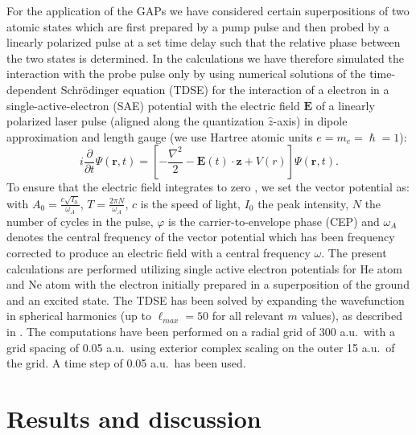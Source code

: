 For the application of the GAPs we have considered certain superpositions of two atomic states which are first prepared by a pump pulse and then probed by a linearly polarized pulse at a set time delay such that the relative phase between the two states is determined. In the calculations we have therefore simulated the interaction with the probe pulse only by
using numerical solutions of the time-dependent Schr\"odinger equation (TDSE) for the interaction of a electron in a single-active-electron (SAE) potential with the electric field $\mathbf{E}$ of a linearly polarized laser pulse (aligned along the quantization ${\hat z}$-axis) in dipole approximation and length gauge (we use Hartree atomic units $e = m_e = \hslash =1$): 
\begin{equation}
i\frac{\partial}{\partial t}\Psi(\mathbf{r},t) = \left[-\frac{\nabla^2}{2} - \mathbf{E}(t) \cdot \mathbf{z} + V(r)\right]\Psi(\mathbf{r},t).
\end{equation}
To ensure that the electric field integrates to zero \cite{chelkowski2002}, we set the vector potential as:
with $A_0 = \frac{c\sqrt{I_0}}{\omega_A}$, $T = \frac{2\pi N}{\omega_A}$, $c$ is the speed of light, $I_0$ the peak intensity, $N$ the number of cycles in the pulse, $\varphi$ is the carrier-to-envelope phase (CEP) and $\omega_A$ denotes the central frequency of the vector potential which has been frequency corrected \cite{venzke2018_Central} to produce an electric field with a central frequency $\omega$.  The present calculations are performed utilizing single active electron potentials for He atom and Ne atom \cite{reiff2020} with the electron initially prepared in a superposition of the ground and an excited state. The TDSE has been solved by expanding the wavefunction in spherical harmonics (up to $\ell_{max} = 50$ for all relevant $m$ values), as described in \cite{venzke2020_ionization}. The computations have been performed on a radial grid of 300 a.u.\ with a grid spacing of 0.05 a.u.\, using exterior complex scaling on the outer 15 a.u.\ of the grid. A time step of 0.05 a.u.\ has been used.

\section*{Results and discussion}

